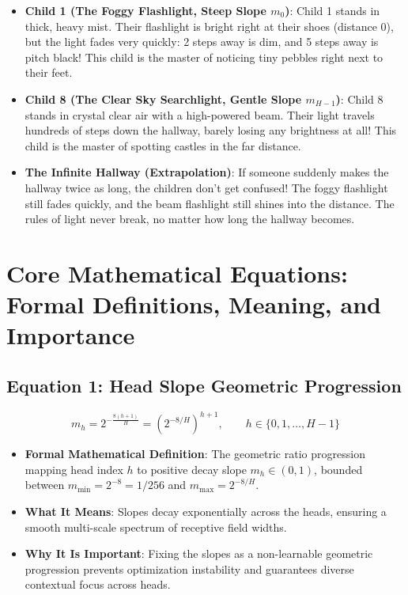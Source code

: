 \documentclass[11pt,a4paper]{article}
\theoremstyle{definition}
\begin{document}
\begin{itemize}
    \item \textbf{Child 1 (The Foggy Flashlight, Steep Slope $m_0$)}:
    Child 1 stands in thick, heavy mist. Their flashlight is bright right at their shoes (distance 0), but the light fades very quickly: 2 steps away is dim, and 5 steps away is pitch black! This child is the master of noticing tiny pebbles right next to their feet.
    
    \item \textbf{Child 8 (The Clear Sky Searchlight, Gentle Slope $m_{H-1}$)}:
    Child 8 stands in crystal clear air with a high-powered beam. Their light travels hundreds of steps down the hallway, barely losing any brightness at all! This child is the master of spotting castles in the far distance.
    
    \item \textbf{The Infinite Hallway (Extrapolation)}:
    If someone suddenly makes the hallway twice as long, the children don't get confused! The foggy flashlight still fades quickly, and the beam flashlight still shines into the distance. The rules of light never break, no matter how long the hallway becomes.
\end{itemize}

\section{Core Mathematical Equations: Formal Definitions, Meaning, and Importance}

\subsection{\textbf{Equation 1: Head Slope Geometric Progression}}
{\boldmath
\begin{equation}
m_h = 2^{-\frac{8(h + 1)}{H}} = \left( 2^{-8/H} \right)^{h+1}, \qquad h \in \{0, 1, \dots, H-1\}
\end{equation}
}
\begin{itemize}
    \item \textbf{Formal Mathematical Definition}:
    The geometric ratio progression mapping head index $h$ to positive decay slope $m_h \in (0, 1)$, bounded between $m_{\text{min}} = 2^{-8} = 1/256$ and $m_{\text{max}} = 2^{-8/H}$.
    \item \textbf{What It Means}:
    Slopes decay exponentially across the heads, ensuring a smooth multi-scale spectrum of receptive field widths.
    \item \textbf{Why It Is Important}:
    Fixing the slopes as a non-learnable geometric progression prevents optimization instability and guarantees diverse contextual focus across heads.
\end{itemize}
\end{document}
